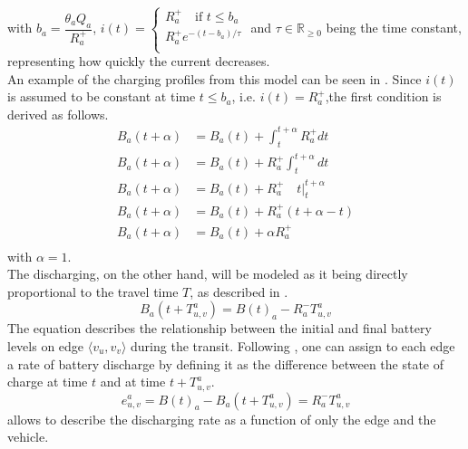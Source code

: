 with $b_a = \dfrac{\theta_a Q_a}{R^+_a}$,  $i(t)= \begin{cases} R^+_a \quad \text{if } t \leq  b_a\\
	R^+_a e^{-(t-b_a)/\tau}\\ \end{cases}$ and $\tau \in \mathbb{R}_{\ge0}$ being the time constant, representing how quickly the current decreases. \\
	An example of the charging profiles from this model can be seen in . 
	 Since $i(t)$ is assumed to be constant at time $t\leq b_a$, i.e. $i(t) = R^+_a$,the first condition is derived as follows. 
\begin{align*}
	B_a(t+\alpha) &= B_a(t) + \int_{t}^{t+\alpha}R^+_adt\\
	B_a(t+\alpha) &= B_a(t) +R^+_a \int_{t}^{t+\alpha}dt\\
	B_a(t+\alpha) &= B_a(t) +R^+_a \quad t \bigg|_{t}^{t+\alpha}\\
	B_a(t+\alpha) &= B_a(t) +R^+_a (t+\alpha - t)\\
	B_a(t+\alpha) &= B_a(t) +\alpha R^+_a\\
\end{align*}
with $\alpha = 1$. \\
The discharging, on the other hand, will be modeled as it being directly proportional to the travel time $T$, as described in . 
\begin{equation}
	B_a(t+T_{u,v}^a) = B(t)_a - R^-_a T_{u,v}^a
	\label{eq:discharging}
\end{equation} 
The equation describes the relationship between the initial and final battery levels on edge $\langle v_u, v_v \rangle$ during the transit. Following , one can assign to each edge a rate of battery discharge by defining it as the difference between the state of charge at time $t$ and at time $t+T_{u,v}^a$. \\
\begin{equation}
	 e^a_{u,v} = B(t)_a - B_a(t+T_{u,v}^a) =  R^-_a T_{u,v}^a
	\label{eq:discharging_rate_per_edge}
\end{equation} 
 allows to describe the discharging rate as a function of only the edge and the vehicle. \\
